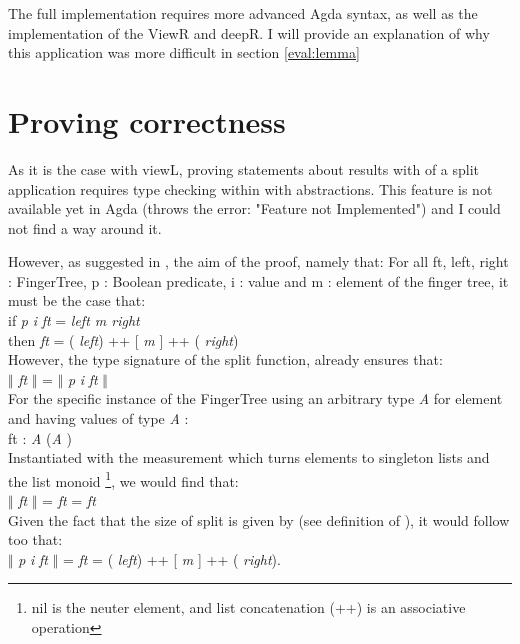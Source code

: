 \documentclass[12pt,twoside,notitlepage]{report}
\begin{document}
The full implementation requires more advanced Agda syntax, as well as the implementation of the ViewR and deepR. I will provide an explanation of why this application was more difficult in section \ref{eval:lemma}

\section{Proving correctness}

As it is the case with viewL, proving statements about results with of a split application requires type checking within with abstractions. This feature is not available yet in Agda (throws the error: "Feature not Implemented") and I could not find a way around it.

However, as suggested in \cite{coq}, the aim of the proof, namely that: For all ft, left, right : FingerTree, p : Boolean predicate, i : value and m : element of the finger tree, it must be the case that: \\
\indent\indent	if  \textit{p} \textit{i} \textit{ft} =  \textit{left m right} \\ 
\indent\indent 	then  \textit{ft}    = ( \textit{left}) ++ [ \textit{m} ] ++ ( \textit{right})\\
However, the type signature of the split function, already ensures that:\\ 
\indent\indent $\Vert$ \textit{ft} $\Vert$ = $\Vert$ \textit{p} \textit{i}  \textit{ft} $\Vert$\\
For the specific instance of the FingerTree using an arbitrary type \textit{A} for element and having values of type \textit{A} 	: \\
\indent\indent ft :  \textit{A} (\textit{A} ) \\
Instantiated with the measurement which turns elements to singleton lists and the list monoid \footnote{nil is the neuter element, and list concatenation (++) is an associative operation}, we would find that: \\
\indent\indent $\Vert$ \textit{ft} $\Vert$ =  \AgdaFunction{\_++\_} \AgdaInductiveConstructor{[]} \textit{ft} =  \textit{ft} \\
Given the fact that the size of split is given by        (see definition of ), it would follow too that: \\
\indent\indent $\Vert$ \textit{p} \textit{i}  \textit{ft} $\Vert$ =  \textit{ft}    = ( \textit{left}) ++ [ \textit{m} ] ++ ( \textit{right}). 
\end{document}
